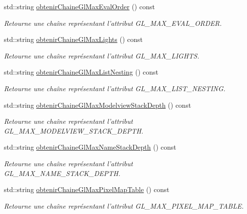 \begin{DoxyCompactItemize}
std\-::string \hyperlink{group__utilitaire_gaf82e6892182ffe565a05329073a06248}{obtenir\-Chaine\-Gl\-Max\-Eval\-Order} () const 
\begin{DoxyCompactList}\small\item\em Retourne une chaîne représentant l'attribut G\-L\-\_\-\-M\-A\-X\-\_\-\-E\-V\-A\-L\-\_\-\-O\-R\-D\-E\-R. \end{DoxyCompactList}\item 
std\-::string \hyperlink{group__utilitaire_ga95b23ba66220abe4def913fd80f31f9c}{obtenir\-Chaine\-Gl\-Max\-Lights} () const 
\begin{DoxyCompactList}\small\item\em Retourne une chaîne représentant l'attribut G\-L\-\_\-\-M\-A\-X\-\_\-\-L\-I\-G\-H\-T\-S. \end{DoxyCompactList}\item 
std\-::string \hyperlink{group__utilitaire_gaab626bdfc4cf8d6445955270799c969a}{obtenir\-Chaine\-Gl\-Max\-List\-Nesting} () const 
\begin{DoxyCompactList}\small\item\em Retourne une chaîne représentant l'attribut G\-L\-\_\-\-M\-A\-X\-\_\-\-L\-I\-S\-T\-\_\-\-N\-E\-S\-T\-I\-N\-G. \end{DoxyCompactList}\item 
std\-::string \hyperlink{group__utilitaire_ga7a7a64fd525a66dfc542f8d38470e6df}{obtenir\-Chaine\-Gl\-Max\-Modelview\-Stack\-Depth} () const 
\begin{DoxyCompactList}\small\item\em Retourne une chaîne représentant l'attribut G\-L\-\_\-\-M\-A\-X\-\_\-\-M\-O\-D\-E\-L\-V\-I\-E\-W\-\_\-\-S\-T\-A\-C\-K\-\_\-\-D\-E\-P\-T\-H. \end{DoxyCompactList}\item 
std\-::string \hyperlink{group__utilitaire_gad22c079b7e29e5cfb6ee2fe9bb220816}{obtenir\-Chaine\-Gl\-Max\-Name\-Stack\-Depth} () const 
\begin{DoxyCompactList}\small\item\em Retourne une chaîne représentant l'attribut G\-L\-\_\-\-M\-A\-X\-\_\-\-N\-A\-M\-E\-\_\-\-S\-T\-A\-C\-K\-\_\-\-D\-E\-P\-T\-H. \end{DoxyCompactList}\item 
std\-::string \hyperlink{group__utilitaire_ga266533ff4a35f65c19be95594d07f435}{obtenir\-Chaine\-Gl\-Max\-Pixel\-Map\-Table} () const 
\begin{DoxyCompactList}\small\item\em Retourne une chaîne représentant l'attribut G\-L\-\_\-\-M\-A\-X\-\_\-\-P\-I\-X\-E\-L\-\_\-\-M\-A\-P\-\_\-\-T\-A\-B\-L\-E. \end{DoxyCompactList}\item 

\end{DoxyCompactItemize}
